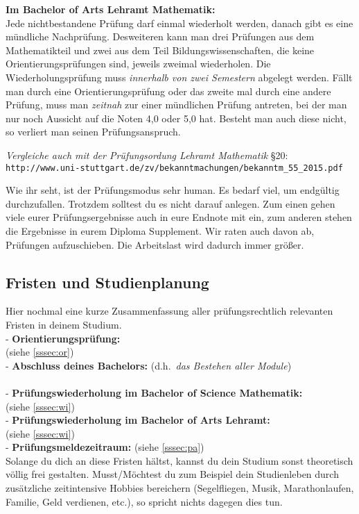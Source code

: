 {\bf Im Bachelor of Arts Lehramt Mathematik:}\\
Jede nichtbestandene Prüfung darf einmal wiederholt werden,
danach gibt es eine mündliche Nachprüfung.
Desweiteren kann man drei Prüfungen aus dem Mathematikteil
und zwei aus dem Teil Bildungswissenschaften,
die keine Orientierungsprüfungen sind,
jeweils zweimal wiederholen.
Die Wiederholungsprüfung muss {\it innerhalb
von zwei Semestern} abgelegt werden.
Fällt man durch eine Orientierungsprüfung
oder das zweite mal durch eine andere Prüfung,
muss man {\it zeitnah} zur einer mündlichen Prüfung antreten,
bei der man nur noch Aussicht auf die Noten 4,0 oder 5,0 hat.
Besteht man auch diese nicht,
so verliert man seinen Prüfungsanspruch.

{\it Vergleiche auch mit der Prüfungsordung Lehramt Mathematik} §20:\\
{\small
\verb|http://www.uni-stuttgart.de/zv/bekanntmachungen/bekanntm_55_2015.pdf|}

Wie ihr seht, ist der Prüfungsmodus sehr human.
Es bedarf viel, um endgültig durchzufallen.
Trotzdem solltest du es nicht darauf anlegen.
Zum einen gehen viele eurer Prüfungsergebnisse
auch in eure Endnote mit ein,
zum anderen stehen die Ergebnisse
in eurem \glqq Diploma Supplement\grqq.
Wir raten auch davon ab, Prüfungen aufzuschieben.
Die Arbeitslast wird dadurch immer größer.

\subsection{Fristen und Studienplanung}\label{ssec:fp}

Hier nochmal eine kurze Zusammenfassung
aller prüfungsrechtlich relevanten Fristen
in deinem Studium.\\[6pt]
- {\bf Orientierungsprüfung:}\\
\hspace{1cm}{\it Bis spätestens zum Beginn des 4.~Semesters} (siehe \ref{sssec:or})\\[3pt]
- {\bf Abschluss deines Bachelors:} (d.h.\ {\it das Bestehen aller Module})\\
\hspace{1cm}{\it Bis spätestens zum Ende des 10.~Semesters}\\[3pt]
- {\bf Prüfungswiederholung im Bachelor of Science Mathematik:}\\
\hspace{1cm}{\it Spätestens beim übernächsten möglichen Termin}
(siehe \ref{sssec:wi})\\[3pt]
- {\bf Prüfungswiederholung im Bachelor of Arts Lehramt:}\\
\hspace{1cm}{\it Spätestens innerhalb von zwei Semestern}
(siehe \ref{sssec:wi})\\[3pt]
- {\bf Prüfungsmeldezeitraum:} (siehe \ref{sssec:pa})\\[6pt]
Solange du dich an diese Fristen hältst,
kannst du dein Studium sonst theoretisch völlig frei gestalten.
Musst/Möchtest du zum Beispiel dein Studienleben
durch zusätzliche zeitintensive Hobbies bereichern
(Segelfliegen, Musik, Marathonlaufen, Familie, Geld verdienen, etc.),
so spricht nichts dagegen dies tun.

